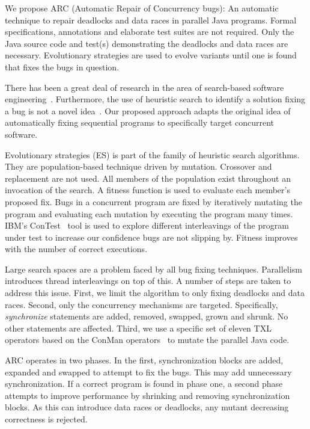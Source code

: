 \documentclass[10pt, conference, compsocconf]{IEEEtran}
\begin{document}
We propose ARC (Automatic Repair of Concurrency bugs): An automatic technique
to repair deadlocks and data races in parallel Java programs. Formal
specifications, annotations and elaborate test suites are not required. Only
the Java source code and test(s) demonstrating the deadlocks and data races are
necessary. Evolutionary strategies are used to evolve variants until one is
found that fixes the bugs in question.

There has been a great deal of research in the area of search-based software
engineering~\cite{Har+10}. Furthermore, the use of heuristic search to identify
a solution fixing a bug is not a novel idea~\cite{FNWG09, AY08, Arc08, WT10,
WNLF09, WFGN10}. Our proposed approach adapts the original idea of
automatically fixing sequential programs to specifically target concurrent
software.

Evolutionary strategies (ES) is part of the family of heuristic search
algorithms. They are population-based technique driven by mutation. Crossover
and replacement are not used.  All members of the population exist throughout
an invocation of the search. A fitness function is used to evaluate each
member's proposed fix. Bugs in a concurrent program are fixed by iteratively
mutating the program and evaluating each mutation by executing the program many
times. IBM's ConTest~\cite{EFN+02} tool is used to explore different interleavings
of the program under test to increase our confidence bugs are not slipping by.
Fitness improves with the number of correct executions.

Large search spaces are a problem faced by all bug fixing techniques.
Parallelism introduces thread interleavings on top of this. A number of steps
are taken to address this issue.  First, we limit the algorithm to only fixing
deadlocks and data races. Second, only the concurrency mechanisms are targeted.
Specifically, \textit{synchronize} statements are added, removed, swapped,
grown and shrunk. No other statements are affected. Third, we use a specific
set of eleven TXL~\cite{CHP91} operators based on the ConMan
operators~\cite{BCD06} to mutate the parallel Java code.

ARC operates in two phases. In the first, synchronization blocks are added,
expanded and swapped to attempt to fix the bugs. This may add unnecessary
synchronization. If a correct program is found in phase one, a second phase 
attempts to improve performance by shrinking and removing synchronization
blocks. As this can introduce data races or deadlocks, any mutant
decreasing correctness is rejected.
\end{document}
